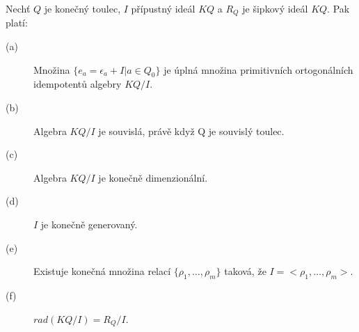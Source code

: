     \begin{thm}\label{mega-veta-toulec}
      Nechť $Q$ je konečný toulec, $I$ přípustný ideál $KQ$ a $R_Q$ je šipkový ideál $KQ$. Pak platí:
      \begin{description}
        \item[(a)] Množina $\{e_a=\epsilon_a+I|a\in Q_0\}$ je úplná množina 
        primitivních ortogonálních idempotentů algebry $KQ/I$.
        \item[(b)] Algebra $KQ/I$ je souvislá, právě když Q je souvislý toulec.
        \item[(c)] Algebra $KQ/I$ je konečně dimenzionální. 
        \item[(d)] $I$ je konečně generovaný. 
        \item[(e)] Existuje konečná množina relací $\{\rho_1,\ldots,\rho_m\}$ 
        taková, že $I=<\rho_1,\ldots,\rho_m>$.
        \item[(f)] $rad(KQ/I)=R_Q/I$.
      \end{description}
    \end{thm}
